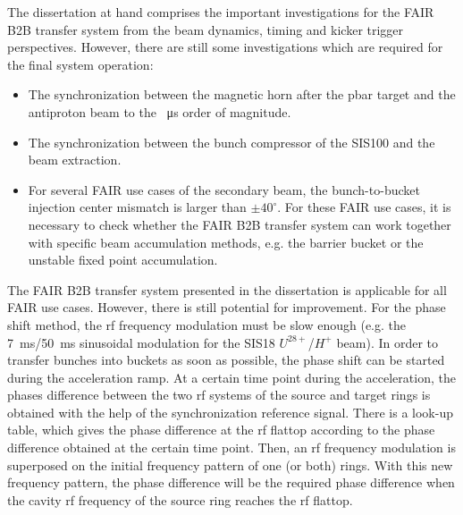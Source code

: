 The dissertation at hand comprises the important investigations for the FAIR B2B transfer system from the beam dynamics, timing and kicker trigger perspectives. However, there are still some investigations which are required for the final system operation:
\begin{itemize}
	\item The synchronization between the magnetic horn after the pbar target and the antiproton beam to the \SI{}{\us} order of magnitude.

	\item  The synchronization between the bunch compressor of the SIS100 and the beam extraction.

	\item  
For several FAIR use cases of the secondary beam, the bunch-to-bucket injection center mismatch is larger than $\pm40^\circ$. For these FAIR use cases, it is necessary to check whether the FAIR B2B transfer system can work together with specific beam accumulation methods, e.g. the barrier bucket or the unstable fixed point accumulation.


\end{itemize}


The FAIR B2B transfer system presented in the dissertation is applicable for all FAIR use cases. However, there is still potential for improvement. For the phase shift method, the rf frequency modulation must be slow enough (e.g. the \SI{7}{\ms}/\SI{50}{\ms} sinusoidal modulation for the SIS18 $U^\mathit{28+}$/$H^\mathit{+}$ beam). In order to transfer bunches into buckets as soon as possible, the phase shift can be started during the acceleration ramp. At a certain time point during the acceleration, the phases difference between the two rf systems of the source and target rings is obtained with the help of the synchronization reference signal. There is a look-up table, which gives the phase difference at the rf flattop according to the phase difference obtained at the certain time point. Then, an rf frequency modulation is superposed on the initial frequency pattern of one (or both) rings. With this new frequency pattern, the phase difference will be the required phase difference when the cavity rf frequency of the source ring reaches the rf flattop. 

